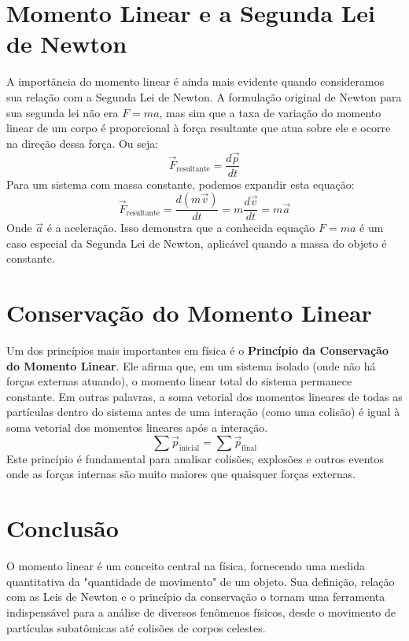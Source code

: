 \documentclass{article}
\begin{document}
\section{Momento Linear e a Segunda Lei de Newton}
A importância do momento linear é ainda mais evidente quando consideramos sua relação com a Segunda Lei de Newton. A formulação original de Newton para sua segunda lei não era $F=ma$, mas sim que a taxa de variação do momento linear de um corpo é proporcional à força resultante que atua sobre ele e ocorre na direção dessa força. Ou seja:
$$ \vec{F}_{\text{resultante}} = \frac{d\vec{p}}{dt} $$
Para um sistema com massa constante, podemos expandir esta equação:
$$ \vec{F}_{\text{resultante}} = \frac{d(m\vec{v})}{dt} = m \frac{d\vec{v}}{dt} = m\vec{a} $$
Onde $\vec{a}$ é a aceleração. Isso demonstra que a conhecida equação $F=ma$ é um caso especial da Segunda Lei de Newton, aplicável quando a massa do objeto é constante.

\section{Conservação do Momento Linear}
Um dos princípios mais importantes em física é o \textbf{Princípio da Conservação do Momento Linear}. Ele afirma que, em um sistema isolado (onde não há forças externas atuando), o momento linear total do sistema permanece constante. Em outras palavras, a soma vetorial dos momentos lineares de todas as partículas dentro do sistema antes de uma interação (como uma colisão) é igual à soma vetorial dos momentos lineares após a interação.
$$ \sum \vec{p}_{\text{inicial}} = \sum \vec{p}_{\text{final}} $$
Este princípio é fundamental para analisar colisões, explosões e outros eventos onde as forças internas são muito maiores que quaisquer forças externas.

\section{Conclusão}
O momento linear é um conceito central na física, fornecendo uma medida quantitativa da "quantidade de movimento" de um objeto. Sua definição, relação com as Leis de Newton e o princípio da conservação o tornam uma ferramenta indispensável para a análise de diversos fenômenos físicos, desde o movimento de partículas subatômicas até colisões de corpos celestes.
\end{document}
